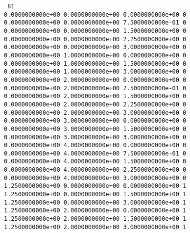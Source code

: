 \documentclass[12pt]{book}
\begin{document}
\noindent
{\tt
81\\
0.0000000000e+00 0.0000000000e+00 0.0000000000e+00 0\\
0.0000000000e+00 0.0000000000e+00 7.5000000000e-01 0\\
0.0000000000e+00 0.0000000000e+00 1.5000000000e+00 0\\
0.0000000000e+00 0.0000000000e+00 2.2500000000e+00 0\\
0.0000000000e+00 0.0000000000e+00 3.0000000000e+00 0\\
0.0000000000e+00 1.0000000000e+00 0.0000000000e+00 0\\
0.0000000000e+00 1.0000000000e+00 1.5000000000e+00 0\\
0.0000000000e+00 1.0000000000e+00 3.0000000000e+00 0\\
0.0000000000e+00 2.0000000000e+00 0.0000000000e+00 0\\
0.0000000000e+00 2.0000000000e+00 7.5000000000e-01 0\\
0.0000000000e+00 2.0000000000e+00 1.5000000000e+00 0\\
0.0000000000e+00 2.0000000000e+00 2.2500000000e+00 0\\
0.0000000000e+00 2.0000000000e+00 3.0000000000e+00 0\\
0.0000000000e+00 3.0000000000e+00 0.0000000000e+00 0\\
0.0000000000e+00 3.0000000000e+00 1.5000000000e+00 0\\
0.0000000000e+00 3.0000000000e+00 3.0000000000e+00 0\\
0.0000000000e+00 4.0000000000e+00 0.0000000000e+00 0\\
0.0000000000e+00 4.0000000000e+00 7.5000000000e-01 0\\
0.0000000000e+00 4.0000000000e+00 1.5000000000e+00 0\\
0.0000000000e+00 4.0000000000e+00 2.2500000000e+00 0\\
0.0000000000e+00 4.0000000000e+00 3.0000000000e+00 0\\
1.2500000000e+00 0.0000000000e+00 0.0000000000e+00 1\\
1.2500000000e+00 0.0000000000e+00 1.5000000000e+00 1\\
1.2500000000e+00 0.0000000000e+00 3.0000000000e+00 1\\
1.2500000000e+00 2.0000000000e+00 0.0000000000e+00 1\\
1.2500000000e+00 2.0000000000e+00 1.5000000000e+00 1\\
1.2500000000e+00 2.0000000000e+00 3.0000000000e+00 1\\
}
\end{document}
